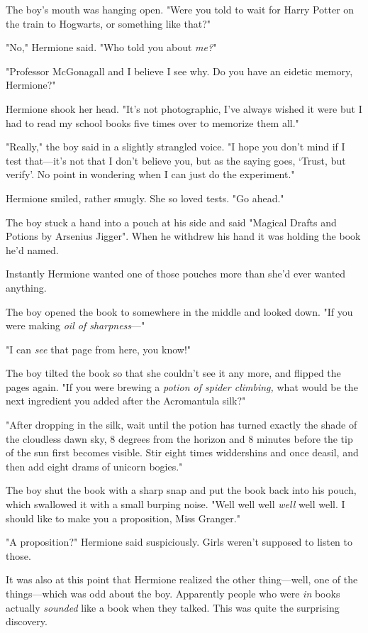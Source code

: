 The boy's mouth was hanging open. "Were you told to wait for Harry Potter on
the train to Hogwarts, or something like that?"

"No," Hermione said. "Who told you about \emph{me?}"

"Professor McGonagall and I believe I see why. Do you have an eidetic memory,
Hermione?"

Hermione shook her head. "It's not photographic, I've always wished it were but
I had to read my school books five times over to memorize them all."

"Really," the boy said in a slightly strangled voice. "I hope you don't mind if
I test that---it's not that I don't believe you, but as the saying goes,
`Trust, but verify'. No point in wondering when I can just do the experiment."

Hermione smiled, rather smugly. She so loved tests. "Go ahead."

The boy stuck a hand into a pouch at his side and said "Magical Drafts and
Potions by Arsenius Jigger". When he withdrew his hand it was holding the book
he'd named.

Instantly Hermione wanted one of those pouches more than she'd ever wanted
anything.

The boy opened the book to somewhere in the middle and looked down. "If you
were making \emph{oil of sharpness}\mbox{---}"

"I can \emph{see} that page from here, you know!"

The boy tilted the book so that she couldn't see it any more, and flipped the
pages again. "If you were brewing a \emph{potion of spider climbing,} what
would be the next ingredient you added after the Acromantula silk?"

"After dropping in the silk, wait until the potion has turned exactly the shade
of the cloudless dawn sky, 8 degrees from the horizon and 8 minutes before the
tip of the sun first becomes visible. Stir eight times widdershins and once
deasil, and then add eight drams of unicorn bogies."

The boy shut the book with a sharp snap and put the book back into his pouch,
which swallowed it with a small burping noise. "Well well well \emph{well} well
well. I should like to make you a proposition, Miss Granger."

"A proposition?" Hermione said suspiciously. Girls weren't supposed to listen
to those.

It was also at this point that Hermione realized the other thing---well, one of
the things---which was odd about the boy. Apparently people who were \emph{in}
books actually \emph{sounded} like a book when they talked. This was quite the
surprising discovery.


